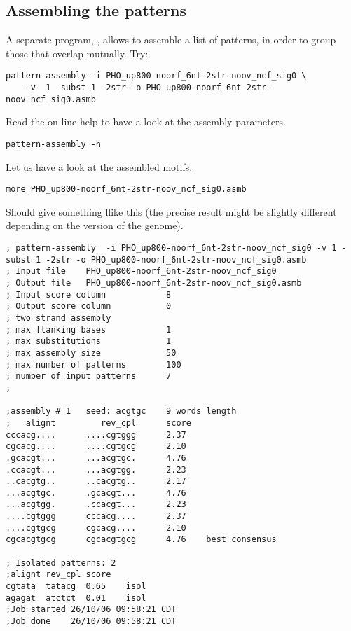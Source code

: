 \subsection{Assembling the patterns}

A separate program, , allows to assemble a
list of patterns, in order to group those that overlap mutually. Try:

{\color{Blue} \begin{footnotesize} 
\begin{verbatim}
pattern-assembly -i PHO_up800-noorf_6nt-2str-noov_ncf_sig0 \
    -v  1 -subst 1 -2str -o PHO_up800-noorf_6nt-2str-noov_ncf_sig0.asmb
\end{verbatim} \end{footnotesize}
}

Read the on-line help to have a look at the assembly parameters. 

{\color{Blue} \begin{footnotesize} 
\begin{verbatim}
pattern-assembly -h
\end{verbatim} \end{footnotesize}
}


Let us have a look at the assembled motifs.
 
{\color{Blue} \begin{footnotesize} 
\begin{verbatim}
more PHO_up800-noorf_6nt-2str-noov_ncf_sig0.asmb
\end{verbatim} \end{footnotesize}
}


Should give something llike this (the precise result might be slightly
different depending on the version of the genome).

{\color{OliveGreen} \begin{tiny} 
\begin{verbatim}
; pattern-assembly  -i PHO_up800-noorf_6nt-2str-noov_ncf_sig0 -v 1 -subst 1 -2str -o PHO_up800-noorf_6nt-2str-noov_ncf_sig0.asmb
; Input file    PHO_up800-noorf_6nt-2str-noov_ncf_sig0
; Output file   PHO_up800-noorf_6nt-2str-noov_ncf_sig0.asmb
; Input score column            8
; Output score column           0
; two strand assembly
; max flanking bases            1
; max substitutions             1
; max assembly size             50
; max number of patterns        100
; number of input patterns      7
;

;assembly # 1   seed: acgtgc    9 words length 
;   alignt         rev_cpl      score
cccacg....      ....cgtggg      2.37
cgcacg....      ....cgtgcg      2.10
.gcacgt...      ...acgtgc.      4.76
.ccacgt...      ...acgtgg.      2.23
..cacgtg..      ..cacgtg..      2.17
...acgtgc.      .gcacgt...      4.76
...acgtgg.      .ccacgt...      2.23
....cgtggg      cccacg....      2.37
....cgtgcg      cgcacg....      2.10
cgcacgtgcg      cgcacgtgcg      4.76    best consensus

; Isolated patterns: 2
;alignt rev_cpl score
cgtata  tatacg  0.65    isol
agagat  atctct  0.01    isol
;Job started 26/10/06 09:58:21 CDT
;Job done    26/10/06 09:58:21 CDT
\end{verbatim} \end{tiny}
}

